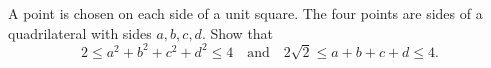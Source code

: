 A point is chosen on each side of a unit square. The four points are sides of a quadrilateral with sides $a, b, c, d$. Show that
\[ 2 \leq a^2 + b^2 + c^2 + d^2 \leq 4 \quad\text{and}\quad 2\sqrt{2} \leq a + b + c + d \leq 4. \]

